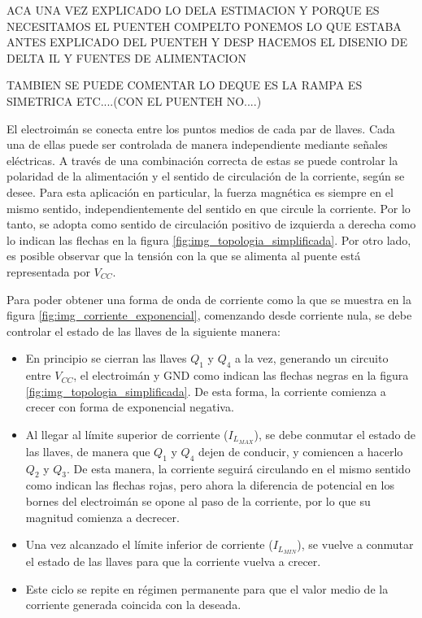 ACA UNA VEZ EXPLICADO LO DELA ESTIMACION Y PORQUE ES NECESITAMOS EL PUENTEH COMPELTO PONEMOS LO QUE ESTABA ANTES EXPLICADO DEL PUENTEH Y DESP HACEMOS EL DISENIO DE DELTA IL Y FUENTES DE ALIMENTACION

TAMBIEN SE PUEDE COMENTAR LO DEQUE ES LA RAMPA ES SIMETRICA ETC....(CON EL PUENTEH NO....)

El electroimán se conecta entre los puntos medios de cada par de llaves. Cada una de ellas puede ser controlada de manera independiente mediante señales eléctricas. A través de una combinación correcta de estas se puede controlar la polaridad de la alimentación y el sentido de circulación de la corriente, según se desee. Para esta aplicación en particular, la fuerza magnética es siempre en el mismo sentido, independientemente del sentido en que circule la corriente. Por lo tanto, se adopta como sentido de circulación positivo de izquierda a derecha como lo indican las flechas en la figura \ref{fig:img_topologia_simplificada}. Por otro lado, es posible observar que la tensión con la que se alimenta al puente está representada por $V_{CC}$.


Para poder obtener una forma de onda de corriente como la que se muestra en la figura \ref{fig:img_corriente_exponencial}, comenzando desde corriente nula, se debe controlar el estado de las llaves de la siguiente manera:


\begin{itemize}
	\item En principio se cierran las llaves $Q_1$ y $Q_4$ a la vez, generando un circuito entre $V_{CC}$, el electroimán y GND como indican las flechas negras en la figura \ref{fig:img_topologia_simplificada}. De esta forma, la corriente comienza a crecer con forma de exponencial negativa.
	\item Al llegar al límite superior de corriente ($I_{L_{MAX}}$), se debe conmutar el estado de las llaves, de manera que $Q_1$ y $Q_4$ dejen de conducir, y comiencen a hacerlo $Q_2$ y $Q_3$. De esta manera, la corriente seguirá circulando en el mismo sentido como indican las flechas rojas, pero ahora la diferencia de potencial en los bornes del electroimán se opone al paso de la corriente, por lo que su magnitud comienza a decrecer.
	\item Una vez alcanzado el límite inferior de corriente ($I_{L_{MIN}}$), se vuelve a conmutar el estado de las llaves para que la corriente vuelva a crecer.
	\item Este ciclo se repite en régimen permanente para que el valor medio de la corriente generada coincida con la deseada. 
\end{itemize}

